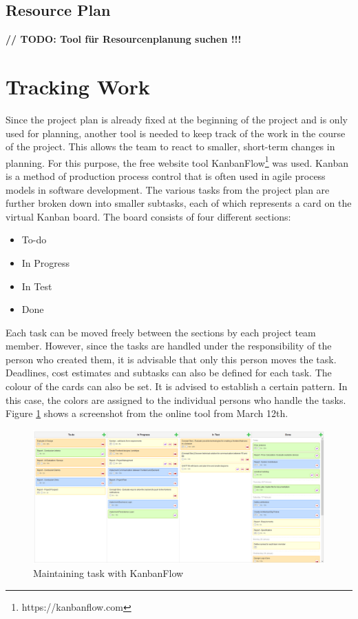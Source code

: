 \subsection{Resource Plan}
\textbf{// TODO: Tool für Resourcenplanung suchen !!!}
\section{Tracking Work}
Since the project plan is already fixed at the beginning of the project and is only used for planning, another tool is needed to keep track of the work in the course of the project. This allows the team to react to smaller, short-term changes in planning. For this purpose, the free website tool KanbanFlow\footnote{https://kanbanflow.com} was used. Kanban is a method of production process control that is often used in agile process models in software development. The various tasks from the project plan are further broken down into smaller subtasks, each of which represents a card on the virtual Kanban board. The board consists of four different sections:
\begin{itemize}
	\item To-do
	\item In Progress
	\item In Test
	\item Done
\end{itemize}
Each task can be moved freely between the sections by each project team member. However, since the tasks are handled under the responsibility of the person who created them, it is advisable that only this person moves the task. Deadlines, cost estimates and subtasks can also be defined for each task. The colour of the cards can also be set. It is advised to establish a certain pattern. In this case, the colors are assigned to the individual persons who handle the tasks. Figure \ref{kanbanflow} shows a screenshot from the online tool from March 12th.
\begin{landscape}
	\thispagestyle{plain}
	\begin{figure}[H]
		\centering
		\includegraphics[width =1.4\textwidth]{images/kanbanflow.PNG}
		\caption{Maintaining task with KanbanFlow}
		\label{kanbanflow}
	\end{figure}
\end{landscape}
